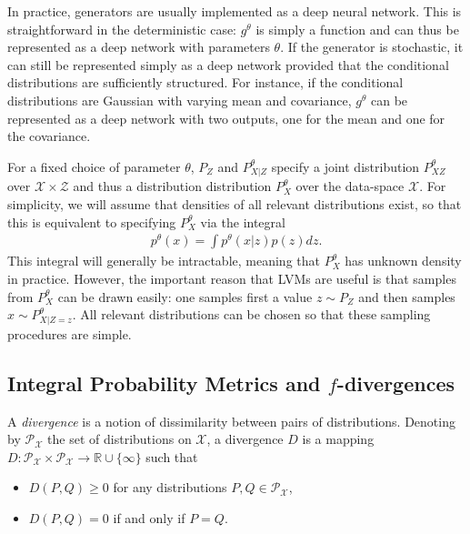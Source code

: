 In practice, generators are usually implemented as a deep neural network.
This is straightforward in the deterministic case: $g^\theta$ is simply a function and can thus be represented as a deep network with parameters $\theta$.
If the generator is stochastic, it can still be represented simply as a deep network provided that the conditional distributions are sufficiently structured. 
For instance, if the conditional distributions are Gaussian with varying mean and covariance, $g^\theta$ can be represented as a deep network with two outputs, one for the mean and one for the covariance.

For a fixed choice of parameter $\theta$, $P_Z$ and $P^\theta_{X|Z}$ specify a joint distribution $P^\theta_{XZ}$ over $\mathcal{X} \times \mathcal{Z}$ and thus a distribution distribution $P_X^\theta$ over the data-space $\mathcal{X}$. 
For simplicity, we will assume that densities of all relevant distributions exist, so that this is equivalent to specifying $P_X^\theta$ via the integral
%
\begin{align*}
p^\theta(x) = \int p^\theta(x|z) p(z) dz.
\end{align*}
%
This integral will generally be intractable, meaning that $P_X^\theta$ has unknown density in practice.
However, the important reason that LVMs are useful is that samples from $P_X^\theta$ can be drawn easily:
one samples first a value $z\sim P_Z$ and then samples $x \sim P^\theta_{X|Z=z}$. 
All relevant distributions can be chosen so that these sampling procedures are simple.


\subsection{Integral Probability Metrics and $f$-divergences}\label{subsec:gen-model-divergence}

A \emph{divergence} is a notion of dissimilarity between pairs of distributions. 
Denoting by $\mathcal{P}_{\mathcal{X}}$ the set of distributions on $\mathcal{X}$, a divergence $D$ is a mapping $D: \mathcal{P}_{\mathcal{X}} \times \mathcal{P}_{\mathcal{X}} \to \mathbb{R} \cup \{\infty\}$ such that

\begin{itemize}
\item $D(P, Q)  \geq 0$ for any distributions $P, Q \in \mathcal{P}_{\mathcal{X}}$,
\item $D(P, Q) = 0$ if and only if $P = Q$.
\end{itemize}

